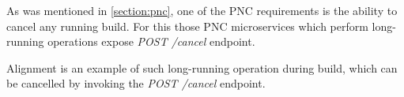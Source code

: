 \documentclass[../main.tex]{subfiles}
\begin{document}
As was mentioned in \ref{section:pnc}, one of the PNC requirements is the ability to cancel any running build. For this those PNC microservices which perform long-running operations expose \textit{POST /cancel} endpoint.

Alignment is an example of such long-running operation during build, which can be cancelled by invoking the \textit{POST /cancel} endpoint.
\end{document}
